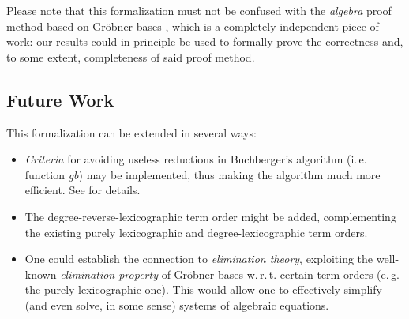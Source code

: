 \documentclass[11pt,a4paper]{article}
\begin{document}
Please note that this formalization must not be confused with the 
\textit{algebra} proof method based on Gr\"obner bases \cite{Chaieb2007}, which 
is a completely independent piece of work: our results could in principle be 
used to formally prove the correctness and, to some extent, completeness of 
said proof method.

\subsection{Future Work}

This formalization can be extended in several ways:
\begin{itemize}
 \item \emph{Criteria} for avoiding useless reductions in Buchberger's 
algorithm (i.\,e. function \textit{gb}) may be implemented, thus making the 
algorithm much more efficient. See \cite{Buchberger1979} for details.

 \item The degree-reverse-lexicographic term order might be added, 
complementing the existing purely lexicographic and degree-lexicographic term 
orders.

 \item One could establish the connection to \emph{elimination theory}, 
exploiting the well-known \emph{elimination property} of Gr\"obner bases 
w.\,r.\,t. certain term-orders (e.\,g. the purely lexicographic one). This 
would allow one to effectively simplify (and even solve, in some sense) 
systems of algebraic equations.
\end{itemize}





\end{document}

